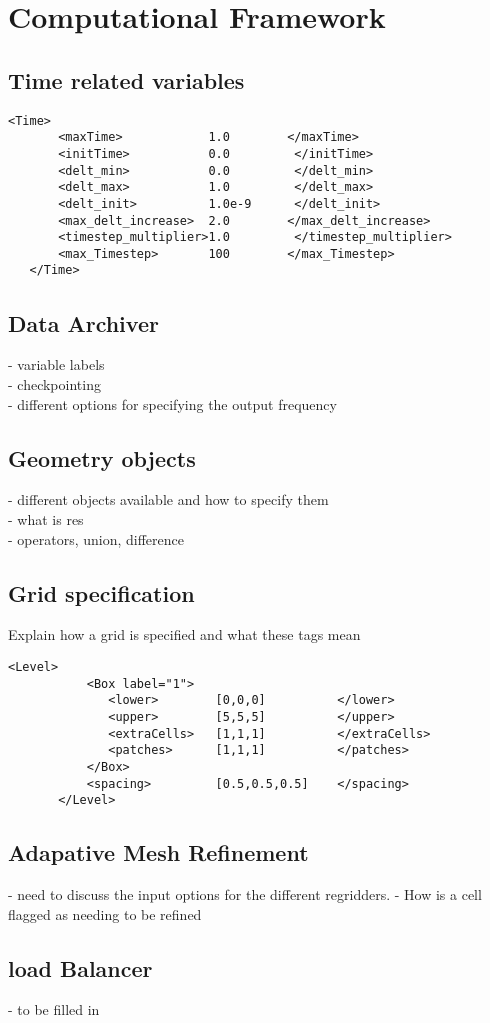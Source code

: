 \section{Computational Framework} \label{Sec:UCF}

\subsection{Time related variables}
\begin{Verbatim}[fontsize=\footnotesize]
   <Time>
       <maxTime>            1.0        </maxTime>
       <initTime>           0.0         </initTime>
       <delt_min>           0.0         </delt_min>
       <delt_max>           1.0         </delt_max>
       <delt_init>          1.0e-9      </delt_init>
       <max_delt_increase>  2.0        </max_delt_increase>
       <timestep_multiplier>1.0         </timestep_multiplier>
       <max_Timestep>       100        </max_Timestep>
   </Time>
\end{Verbatim}
%
\subsection{Data Archiver}
- variable labels\\
- checkpointing \\
- different options for specifying the output frequency\\
%
\subsection{Geometry objects}
- different objects available and how to specify them\\
- what is res \\
- operators, union, difference\\
%
\subsection{Grid specification}
Explain how a grid is specified and what these tags mean

\begin{Verbatim}[fontsize=\footnotesize]
       <Level>
           <Box label="1">
              <lower>        [0,0,0]          </lower>
              <upper>        [5,5,5]          </upper>
              <extraCells>   [1,1,1]          </extraCells>
              <patches>      [1,1,1]          </patches>
           </Box>
           <spacing>         [0.5,0.5,0.5]    </spacing>
       </Level>
 \end{Verbatim}
%
\subsection{Adapative Mesh Refinement}
- need to discuss the input options for the different regridders.
- How is a cell flagged as needing to be refined
%
\subsection{load Balancer}
- to be filled in
